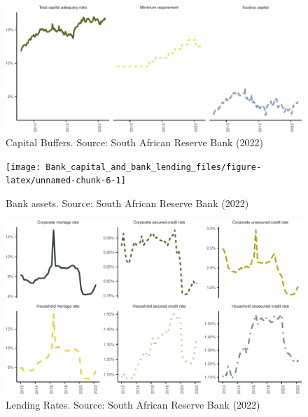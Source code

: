 \documentclass[
]{article}
\begin{document}
\begin{figure}[H]

\includegraphics{Bank_capital_and_bank_lending_files/figure-latex/unnamed-chunk-3-1} \hfill{}

\caption{Capital Buffers. Source: South African Reserve Bank (2022)}\label{fig:unnamed-chunk-3}
\end{figure}

\begin{figure}[H]

\texttt{[image: Bank\_capital\_and\_bank\_lending\_files/figure-latex/unnamed-chunk-6-1]} \hfill{}

\caption{Bank assets. Source: South African Reserve Bank (2022)}\label{fig:unnamed-chunk-6}
\end{figure}

\begin{figure}[H]

\includegraphics{Bank_capital_and_bank_lending_files/figure-latex/unnamed-chunk-7-1} \hfill{}

\caption{Lending Rates. Source: South African Reserve Bank (2022)}\label{fig:unnamed-chunk-7}
\end{figure}

\newpage
\end{document}
